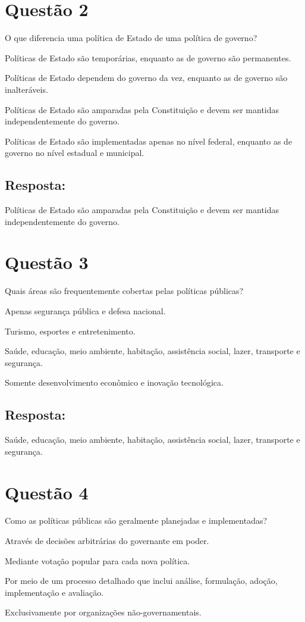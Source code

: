 \documentclass[
   article,       
   12pt,          
   oneside,       
   a4paper,       
   english,       
   brazil,        
   sumario=tradicional
   ]{abntex2}
\begin{document}
\section{Questão 2}
O que diferencia uma política de Estado de uma política de governo?
\itemize
    \item Políticas de Estado são temporárias, enquanto as de governo são permanentes.
    \item Políticas de Estado dependem do governo da vez, enquanto as de governo são inalteráveis.
    \item Políticas de Estado são amparadas pela Constituição e devem ser mantidas independentemente do governo.
    \item Políticas de Estado são implementadas apenas no nível federal, enquanto as de governo no nível estadual e municipal.
\subsection{Resposta:}
Políticas de Estado são amparadas pela Constituição e devem ser mantidas independentemente do governo.
\section{Questão 3}
Quais áreas são frequentemente cobertas pelas políticas públicas?
\itemize
    \item Apenas segurança pública e defesa nacional.
    \item Turismo, esportes e entretenimento.
    \item Saúde, educação, meio ambiente, habitação, assistência social, lazer, transporte e segurança.
    \item Somente desenvolvimento econômico e inovação tecnológica.
\subsection{Resposta:}
Saúde, educação, meio ambiente, habitação, assistência social, lazer, transporte e segurança.
\section{Questão 4}
Como as políticas públicas são geralmente planejadas e implementadas?
\itemize
    \item Através de decisões arbitrárias do governante em poder.
    \item Mediante votação popular para cada nova política.
    \item Por meio de um processo detalhado que inclui análise, formulação, adoção, implementação e avaliação.
    \item Exclusivamente por organizações não-governamentais.
\end{document}
